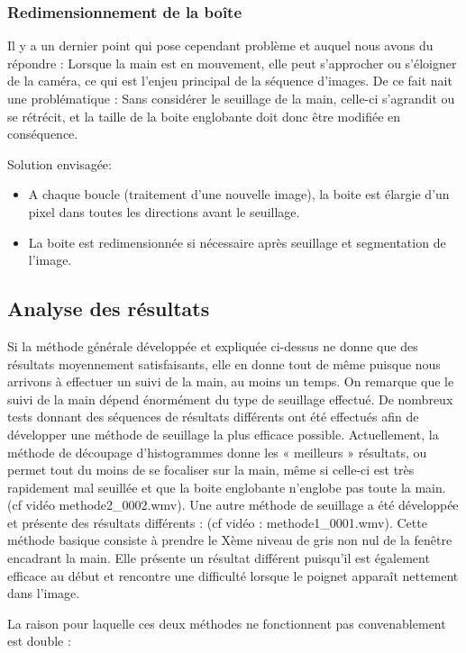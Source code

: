 \subsubsection{Redimensionnement de la boîte}

Il y a un dernier point qui pose cependant problème et auquel nous avons du répondre : Lorsque la main est en mouvement, elle peut s’approcher ou s’éloigner de la caméra, ce qui est l’enjeu principal de la séquence d’images. De ce fait nait une problématique : 
	Sans considérer le seuillage de la main, celle-ci s’agrandit ou se rétrécit, et la taille de la boite englobante doit donc être modifiée en conséquence.

Solution envisagée:
\begin{itemize}
\item A chaque boucle (traitement d’une nouvelle image), la boite est élargie d’un pixel dans toutes les directions avant le seuillage.
\item La boite est redimensionnée si nécessaire après seuillage et segmentation de l’image. 
\end{itemize}

\subsection{Analyse des résultats}
Si la méthode générale développée et expliquée ci-dessus ne donne que des résultats moyennement satisfaisants, elle en donne tout de même puisque nous arrivons à effectuer un suivi de la main, au moins un temps. 
	On remarque que le suivi de la main dépend énormément du type de seuillage effectué. De nombreux tests donnant des séquences de résultats différents ont été effectués afin de développer une méthode de seuillage la plus efficace possible. Actuellement, la méthode de découpage d’histogrammes donne les « meilleurs » résultats, ou permet tout du moins de se focaliser sur la main, même si celle-ci est très rapidement mal seuillée et que la boite englobante n’englobe pas toute la main. (cf vidéo methode2\_0002.wmv).
	Une autre méthode de seuillage a été développée et présente des résultats différents : (cf vidéo : methode1\_0001.wmv). Cette méthode basique consiste à prendre le Xème niveau de gris non nul de la fenêtre encadrant la main. Elle présente un résultat différent puisqu’il est également efficace au début et rencontre une difficulté lorsque le poignet apparaît nettement dans l’image.

La raison pour laquelle ces deux méthodes ne fonctionnent pas convenablement est double :

